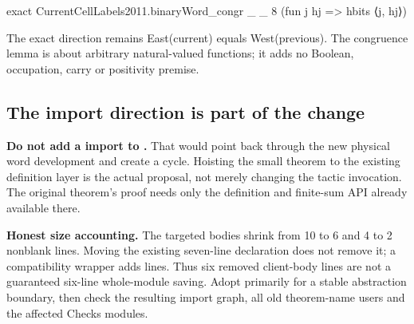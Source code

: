 \begin{Lean}
  exact CurrentCellLabels2011.binaryWord_congr _ _ 8
    (fun j hj => hbits ⟨j, hj⟩)
\end{Lean}

The exact direction remains East(current) equals West(previous). The
congruence lemma is about arbitrary natural-valued functions; it adds no
Boolean, occupation, carry or positivity premise.

\subsection{The import direction is part of the change}

\textbf{Do not add a  import to
.} That would point back through the new physical
word development and create a cycle. Hoisting the small theorem to the
existing definition layer is the actual proposal, not merely changing the
tactic invocation. The original theorem's proof needs only the definition
and finite-sum API already available there.

\textbf{Honest size accounting.} The targeted bodies shrink from 10 to 6 and
4 to 2 nonblank lines. Moving the existing seven-line declaration does not
remove it; a compatibility wrapper adds lines. Thus six removed client-body
lines are not a guaranteed six-line whole-module saving. Adopt primarily
for a stable abstraction boundary, then check the resulting import graph,
all old theorem-name users and the affected Checks modules.

